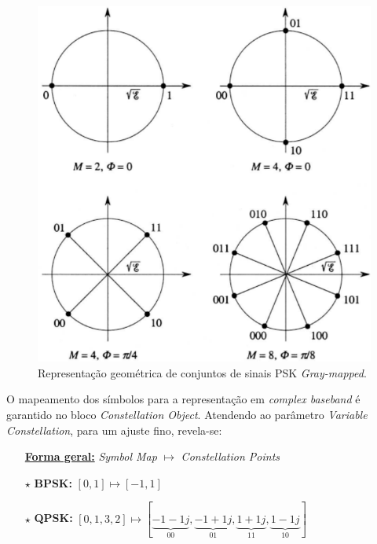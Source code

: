 \begin{figure}[H]
    \centering
    \includegraphics[width = 0.5\linewidth]{img/intro/gray-mapped_constellation.png}
    \caption{Representação geométrica de conjuntos de sinais PSK \textit{Gray-mapped}\cite{benedetto_biglieri_2002}.}
    \label{fig:constellations}
\end{figure}

O mapeamento dos símbolos para a representação em \textit{complex baseband} é garantido no bloco \textit{Constellation Object}. Atendendo ao parâmetro \textit{Variable Constellation}, para um ajuste fino, revela-se:
\begin{itemize}
    \item[] \underline{\textbf{Forma geral:}} \textit{Symbol Map} $\mapsto$ \textit{Constellation Points}
    \item[$\star$] \textbf{BPSK:} $[0, 1]\mapsto[-1, 1]$
    \item[$\star$] \textbf{QPSK:} $[0, 1, 3, 2]\mapsto[\underbrace{-1-1j}_{00},\underbrace{-1+1j}_{01},\underbrace{1+1j}_{11},\underbrace{1-1j}_{10}]$
\end{itemize}